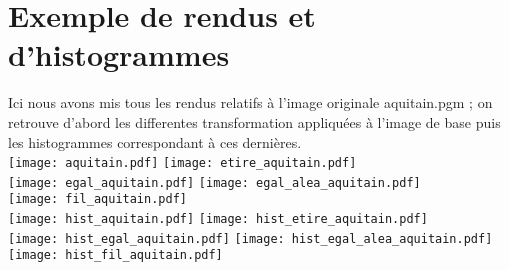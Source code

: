 \documentclass[12pt]{article}
\numberwithin{equation}{section}
\begin{document}
\section{Exemple de rendus et d'histogrammes}
Ici nous avons mis tous les rendus relatifs à l'image originale aquitain.pgm ; on retrouve d'abord les differentes transformation appliquées à l'image de base puis les histogrammes correspondant à ces dernières.\\
\texttt{[image: aquitain.pdf]}
\texttt{[image: etire\_aquitain.pdf]}
\\
\texttt{[image: egal\_aquitain.pdf]}
\texttt{[image: egal\_alea\_aquitain.pdf]}
\\
\texttt{[image: fil\_aquitain.pdf]}
\\
\texttt{[image: hist\_aquitain.pdf]}
\texttt{[image: hist\_etire\_aquitain.pdf]}
\\
\texttt{[image: hist\_egal\_aquitain.pdf]}
\texttt{[image: hist\_egal\_alea\_aquitain.pdf]}
\\
\texttt{[image: hist\_fil\_aquitain.pdf]}
\end{document}

